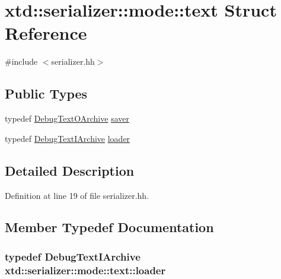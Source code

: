 \hypertarget{structxtd_1_1serializer_1_1mode_1_1text}{}\section{xtd\+:\+:serializer\+:\+:mode\+:\+:text Struct Reference}
\label{structxtd_1_1serializer_1_1mode_1_1text}


{\ttfamily \#include $<$serializer.\+hh$>$}

\subsection*{Public Types}
\begin{DoxyCompactItemize}
\item 
typedef \hyperlink{classxtd_1_1serializer_1_1DebugTextOArchive}{Debug\+Text\+O\+Archive} \hyperlink{structxtd_1_1serializer_1_1mode_1_1text_a8be416039df8bbed799423bb996811a8}{saver}
\item 
typedef \hyperlink{classxtd_1_1serializer_1_1DebugTextIArchive}{Debug\+Text\+I\+Archive} \hyperlink{structxtd_1_1serializer_1_1mode_1_1text_ad178828d538da6465ca47886a70ac664}{loader}
\end{DoxyCompactItemize}


\subsection{Detailed Description}


Definition at line 19 of file serializer.\+hh.



\subsection{Member Typedef Documentation}
\subsubsection[{\texorpdfstring{loader}{loader}}]{\setlength{\rightskip}{0pt plus 5cm}typedef {\bf Debug\+Text\+I\+Archive} {\bf xtd\+::serializer\+::mode\+::text\+::loader}}\hypertarget{structxtd_1_1serializer_1_1mode_1_1text_ad178828d538da6465ca47886a70ac664}{}\label{structxtd_1_1serializer_1_1mode_1_1text_ad178828d538da6465ca47886a70ac664}


